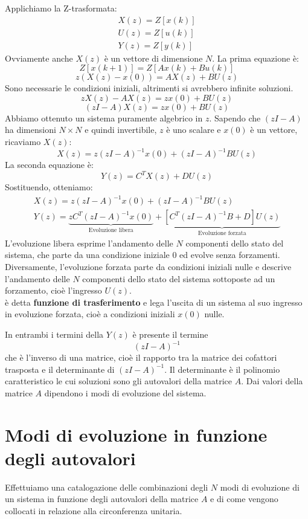 \documentclass[a4paper]{report}
\newcommand{\bo}{\bfseries }
\begin{document}
Applichiamo la Z-trasformata:
\[
\begin{array}{l}
  X(z) = Z[x(k)]\\
  U(z) = Z[u(k)]\\
  Y(z) = Z[y(k)]
\end{array}
\]
Ovviamente anche $X(z)$ \`e un vettore di dimensione $N$. La prima
equazione \`e:
\[
Z[x(k + 1)] = Z[Ax(k) + Bu(k)]
\]
\[
z(X(z) - x(0)) = AX(z) + BU(z)
\]
Sono necessarie le condizioni iniziali, altrimenti si avrebbero
infinite soluzioni.
\[
zX(z) - AX(z) = zx(0) + BU(z)
\]
\[
(zI - A)X(z) = zx(0) + BU(z)
\]
Abbiamo ottenuto un sistema puramente algebrico in $z$. Sapendo che
$(zI - A)$ ha dimensioni $N \times N$ e quindi invertibile, $z$ \`e
uno scalare e $x(0)$ \`e un vettore, ricaviamo $X(z)$: 
\begin{equation}
X(z) = z(zI - A)^{-1}x(0) + (zI - A)^{-1}BU(z)
\end{equation}
La seconda equazione \`e:
\[
Y(z) = C^T X(z) + DU(z)
\]
Sostituendo, otteniamo:
\begin{equation}
\begin{array}{l}
  X(z) = z(zI - A)^{-1}x(0) + (zI - A)^{-1}BU(z)\\
  Y(z) = \underbrace{zC^{T} (zI - A)^{-1} x(0)}_\text{Evoluzione
    libera} + \underbrace{[C^T (zI - A)^{-1} B +
      D]U(z)}_\text{Evoluzione forzata}
\end{array}
\end{equation}
L'evoluzione libera esprime l'andamento delle $N$ componenti dello
stato del sistema, che parte da una condizione iniziale $0$ ed evolve
senza forzamenti. Diversamente, l'evoluzione forzata parte da
condizioni iniziali nulle e descrive l'andamento delle $N$ componenti
dello stato del sistema sottoposte ad un forzamento, cio\`e
l'ingresso $U(z)$.
\begin{equation}
  [C^T (zI - A)^{-1} B + D]
\end{equation}
\`e detta {\bo funzione di trasferimento} e lega l'uscita di un
sistema al suo ingresso in evoluzione forzata, cio\`e a condizioni
iniziali $x(0)$ nulle.

In entrambi i termini della $Y(z)$ \`e presente il termine
\[
(zI - A)^{-1}
\]
che \`e l'inverso di una matrice, cio\`e il rapporto tra la matrice
dei cofattori trasposta e il determinante di $(zI - A)^{-1}$. Il
determinante \`e il polinomio caratteristico le cui soluzioni sono gli
autovalori della matrice $A$. Dai valori della matrice $A$ dipendono i
modi di evoluzione del sistema.

\section{Modi di evoluzione in funzione degli autovalori}
Effettuiamo una catalogazione delle combinazioni degli $N$ modi di
evoluzione di un sistema in funzione degli autovalori della matrice
$A$ e di come vengono collocati in relazione alla circonferenza
unitaria.
\end{document}
